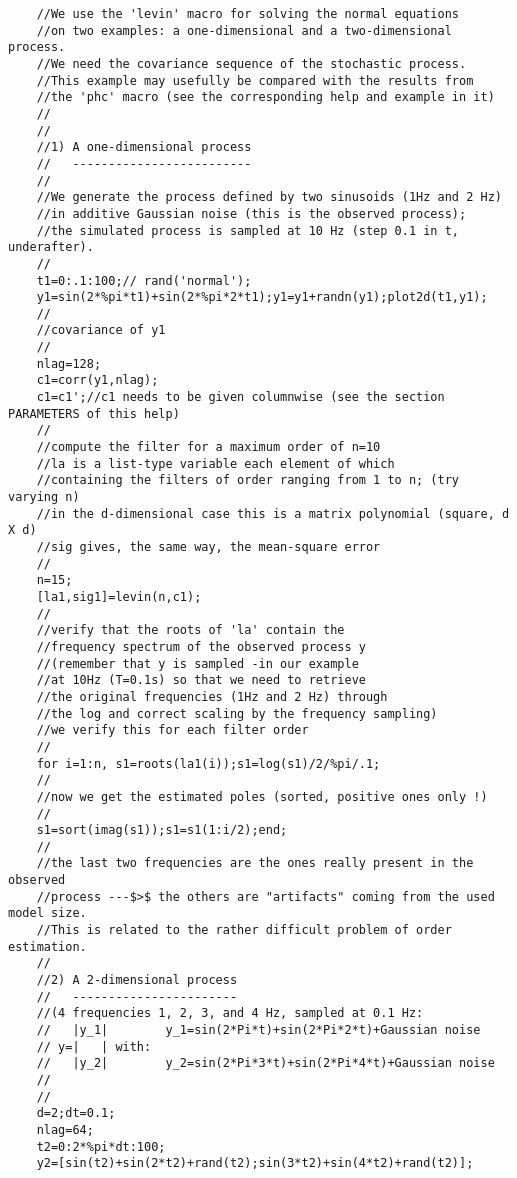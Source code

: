 \begin{examples}
  \begin{Verbatim}
    //We use the 'levin' macro for solving the normal equations 
    //on two examples: a one-dimensional and a two-dimensional process.
    //We need the covariance sequence of the stochastic process.
    //This example may usefully be compared with the results from 
    //the 'phc' macro (see the corresponding help and example in it)
    //
    //
    //1) A one-dimensional process
    //   -------------------------
    //
    //We generate the process defined by two sinusoids (1Hz and 2 Hz) 
    //in additive Gaussian noise (this is the observed process); 
    //the simulated process is sampled at 10 Hz (step 0.1 in t, underafter).
    //
    t1=0:.1:100;// rand('normal');
    y1=sin(2*%pi*t1)+sin(2*%pi*2*t1);y1=y1+randn(y1);plot2d(t1,y1);
    //
    //covariance of y1
    //
    nlag=128;
    c1=corr(y1,nlag);
    c1=c1';//c1 needs to be given columnwise (see the section PARAMETERS of this help)
    //
    //compute the filter for a maximum order of n=10
    //la is a list-type variable each element of which 
    //containing the filters of order ranging from 1 to n; (try varying n)
    //in the d-dimensional case this is a matrix polynomial (square, d X d)
    //sig gives, the same way, the mean-square error
    //
    n=15;
    [la1,sig1]=levin(n,c1);
    //
    //verify that the roots of 'la' contain the 
    //frequency spectrum of the observed process y
    //(remember that y is sampled -in our example 
    //at 10Hz (T=0.1s) so that we need to retrieve 
    //the original frequencies (1Hz and 2 Hz) through 
    //the log and correct scaling by the frequency sampling)
    //we verify this for each filter order
    //
    for i=1:n, s1=roots(la1(i));s1=log(s1)/2/%pi/.1;
    //
    //now we get the estimated poles (sorted, positive ones only !)
    //
    s1=sort(imag(s1));s1=s1(1:i/2);end;
    //
    //the last two frequencies are the ones really present in the observed 
    //process ---$>$ the others are "artifacts" coming from the used model size.
    //This is related to the rather difficult problem of order estimation.
    //
    //2) A 2-dimensional process 
    //   -----------------------
    //(4 frequencies 1, 2, 3, and 4 Hz, sampled at 0.1 Hz:
    //   |y_1|        y_1=sin(2*Pi*t)+sin(2*Pi*2*t)+Gaussian noise
    // y=|   | with: 
    //   |y_2|        y_2=sin(2*Pi*3*t)+sin(2*Pi*4*t)+Gaussian noise
    //
    //
    d=2;dt=0.1;
    nlag=64;
    t2=0:2*%pi*dt:100;
    y2=[sin(t2)+sin(2*t2)+rand(t2);sin(3*t2)+sin(4*t2)+rand(t2)];

\end{Verbatim}
\end{examples}
